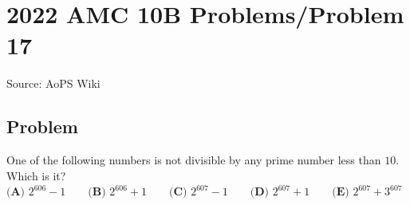 \documentclass[12pt]{article}
\begin{document}
\section*{{2022 AMC 10B Problems/Problem 17}}
Source: AoPS Wiki

\subsection*{Problem}
One of the following numbers is not divisible by any prime number less than $10.$ Which is it? $\textbf{(A) } 2^{606}-1 \qquad\textbf{(B) } 2^{606}+1 \qquad\textbf{(C) } 2^{607}-1 \qquad\textbf{(D) } 2^{607}+1\qquad\textbf{(E) } 2^{607}+3^{607}$
\end{document}
